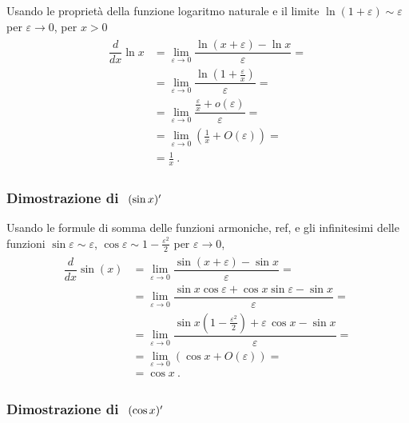\documentclass[letterpaper,10pt,english]{jupyterBook}
\begin{document}
\sphinxAtStartPar
Usando le proprietà della funzione logaritmo naturale e il limite \(\ln(1 + \varepsilon) \sim \varepsilon\) per \(\varepsilon \rightarrow 0\), per \(x > 0\)
\begin{equation*}
\begin{split}\begin{aligned}
  \dfrac{d}{dx} \ln x       
  & = \lim_{\varepsilon \rightarrow 0}  \dfrac{\ln(x+\varepsilon) - \ln x}{\varepsilon} = \\
  & = \lim_{\varepsilon \rightarrow 0}  \dfrac{\ln \left(1 + \frac{\varepsilon}{x} \right)}{\varepsilon} = \\
  & = \lim_{\varepsilon \rightarrow 0}  \dfrac{\frac{\varepsilon}{x} + o(\varepsilon)}{\varepsilon} = \\
  & = \lim_{\varepsilon \rightarrow 0}  \left( \frac{1}{x} + O(\varepsilon) \right) = \\
  & = \frac{1}{x} \ .
\end{aligned}\end{split}
\end{equation*}\subsubsection*{Dimostrazione di \protect\(\ (\sin x)'\protect\)}

\sphinxAtStartPar
Usando le formule di somma delle funzioni armoniche,  ref, e gli infinitesimi delle funzioni \(\sin \varepsilon \sim \varepsilon\), \(\cos \varepsilon \sim 1 - \frac{\varepsilon^2}{2}\) per \(\varepsilon \rightarrow 0\),
\begin{equation*}
\begin{split}\begin{aligned}
  \dfrac{d}{dx} \sin(x) 
  & = \lim_{\varepsilon \rightarrow 0}  \dfrac{\sin(x+\varepsilon) - \sin x}{\varepsilon} = \\
  & = \lim_{\varepsilon \rightarrow 0} \dfrac{\sin x \cos \varepsilon + \cos x \sin \varepsilon - \sin x}{\varepsilon} = \\
  & = \lim_{\varepsilon \rightarrow 0} \dfrac{\sin x \left( 1 - \frac{\varepsilon^2}{2} \right) + \varepsilon \, \cos x - \sin x}{\varepsilon} = \\
  & = \lim_{\varepsilon \rightarrow 0} \left( \cos x + O(\varepsilon) \right) = \\
  & = \cos x \ .
\end{aligned}\end{split}
\end{equation*}\subsubsection*{Dimostrazione di \protect\(\ (\cos x)'\protect\)}
\end{document}
